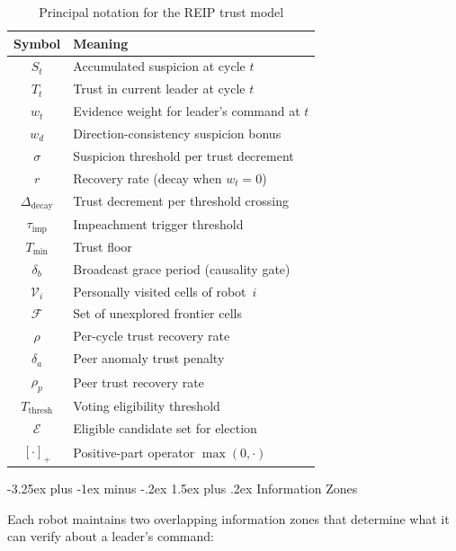 \documentclass[conference]{IEEEtran}
\makeatletter
\newcommand{\clip}[1]{\left[#1\right]_+}
\renewcommand{\subsection}{\@startsection{subsection}{2}{\z@}%
  {-3.25ex plus -1ex minus -.2ex}%
  {1.5ex plus .2ex}%
  {\normalfont\normalsize\itshape\centering}}
\makeatother
\begin{document}
\begin{table}[t]
\centering
\caption{Principal notation for the REIP trust model}
\label{tab:notation}
\small
\begin{tabular}{@{}cl@{}}
\toprule
Symbol & Meaning \\
\midrule
$S_t$                    & Accumulated suspicion at cycle $t$ \\
$T_t$                    & Trust in current leader at cycle $t$ \\
$w_t$                    & Evidence weight for leader's command at $t$ \\
$w_d$                    & Direction-consistency suspicion bonus \\
$\sigma$                 & Suspicion threshold per trust decrement \\
$r$                      & Recovery rate (decay when $w_t = 0$) \\
$\Delta_{\text{decay}}$  & Trust decrement per threshold crossing \\
$\tau_{\text{imp}}$      & Impeachment trigger threshold \\
$T_{\min}$               & Trust floor \\
$\delta_b$               & Broadcast grace period (causality gate) \\
$\mathcal{V}_i$          & Personally visited cells of robot~$i$ \\
$\mathcal{F}$            & Set of unexplored frontier cells \\
$\rho$                   & Per-cycle trust recovery rate \\
$\delta_a$               & Peer anomaly trust penalty \\
$\rho_p$                 & Peer trust recovery rate \\
$T_{\text{thresh}}$      & Voting eligibility threshold \\
$\mathcal{E}$            & Eligible candidate set for election \\
$\clip{\cdot}$           & Positive-part operator $\max(0,\cdot)$ \\
\bottomrule
\end{tabular}
\end{table}

\subsection{Information Zones}
\label{sec:info_zones}

Each robot maintains two overlapping information zones that determine what it can verify about a leader's command:
\end{document}
